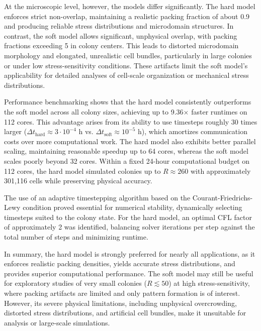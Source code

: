 \documentclass[conference]{IEEEtran}
\begin{document}
At the microscopic level, however, the models differ significantly. The hard model enforces strict non-overlap, maintaining a realistic packing fraction of about 0.9 and producing reliable stress distributions and microdomain structures. In contrast, the soft model allows significant, unphysical overlap, with packing fractions exceeding 5 in colony centers. This leads to distorted microdomain morphology and elongated, unrealistic cell bundles, particularly in large colonies or under low stress-sensitivity conditions. These artifacts limit the soft model's applicability for detailed analyses of cell-scale organization or mechanical stress distributions.

Performance benchmarking shows that the hard model consistently outperforms the soft model across all colony sizes, achieving up to 9.36$\times$ faster runtimes on 112 cores. This advantage arises from its ability to use timesteps roughly 30 times larger ($\Delta t_{\text{hard}} \approx 3 \cdot 10^{-4}$ h vs. $\Delta t_{\text{soft}} \approx 10^{-5}$ h), which amortizes communication costs over more computational work. The hard model also exhibits better parallel scaling, maintaining reasonable speedup up to 64 cores, whereas the soft model scales poorly beyond 32 cores. Within a fixed 24-hour computational budget on 112 cores, the hard model simulated colonies up to $R \approx 260$ with approximately 301,116 cells while preserving physical accuracy.

The use of an adaptive timestepping algorithm based on the Courant-Friedrichs-Lewy condition proved essential for numerical stability, dynamically selecting timesteps suited to the colony state. For the hard model, an optimal CFL factor of approximately 2 was identified, balancing solver iterations per step against the total number of steps and minimizing runtime.

In summary, the hard model is strongly preferred for nearly all applications, as it enforces realistic packing densities, yields accurate stress distributions, and provides superior computational performance. The soft model may still be useful for exploratory studies of very small colonies ($R \lesssim 50$) at high stress-sensitivity, where packing artifacts are limited and only pattern formation is of interest. However, its severe physical limitations, including unphysical overcrowding, distorted stress distributions, and artificial cell bundles, make it unsuitable for analysis or large-scale simulations.

\newpage
\end{document}
